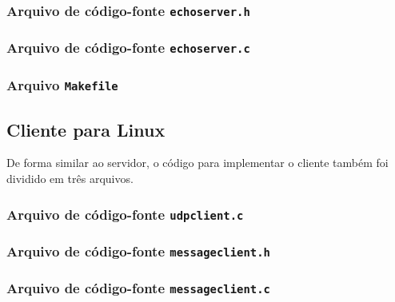 \documentclass[12pt]{article}
\begin{document}


\subsubsection{Arquivo de código-fonte \texttt{echoserver.h}}



\subsubsection{Arquivo de código-fonte \texttt{echoserver.c}}



\subsubsection{Arquivo \texttt{Makefile}}



\subsection{Cliente para Linux}

De forma similar ao servidor, o código para implementar o cliente também foi
dividido em três arquivos.

\subsubsection{Arquivo de código-fonte \texttt{udpclient.c}}



\subsubsection{Arquivo de código-fonte \texttt{messageclient.h}}



\subsubsection{Arquivo de código-fonte \texttt{messageclient.c}}


\end{document}
